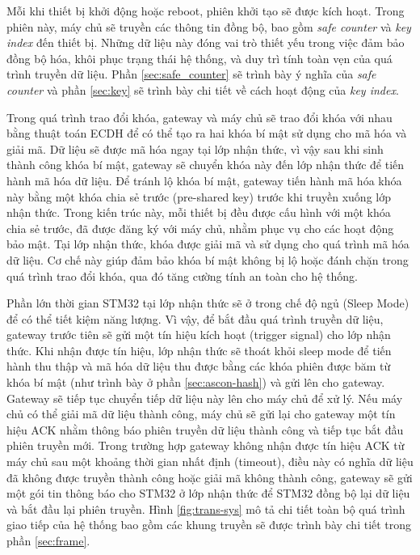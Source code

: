 Mỗi khi thiết bị khởi động hoặc reboot, phiên khởi tạo sẽ được kích hoạt. Trong phiên này, máy chủ sẽ truyền các thông tin đồng bộ, bao gồm \textit{safe counter} và \textit{key index} đến thiết bị. Những dữ liệu này đóng vai trò thiết yếu trong việc đảm bảo đồng bộ hóa, khôi phục trạng thái hệ thống, và duy trì tính toàn vẹn của quá trình truyền dữ liệu. Phần \ref{sec:safe_counter} sẽ trình bày ý nghĩa của \textit{safe counter} và phần \ref{sec:key} sẽ trình bày chi tiết về cách hoạt động của \textit{key index}.

Trong quá trình trao đổi khóa, gateway và máy chủ sẽ trao đổi khóa với nhau bằng thuật toán ECDH để có thể tạo ra hai khóa bí mật sử dụng cho mã hóa và giải mã. Dữ liệu sẽ được mã hóa ngay tại lớp nhận thức, vì vậy sau khi sinh thành công khóa bí mật, gateway sẽ chuyển khóa này đến lớp nhận thức để tiến hành mã hóa dữ liệu. Để tránh lộ khóa bí mật, gateway tiến hành mã hóa khóa này bằng một khóa chia sẻ trước (pre-shared key) trước khi truyền xuống lớp nhận thức. 
Trong kiến trúc này, mỗi thiết bị đều được cấu hình với một khóa chia sẻ trước, đã được đăng ký với máy chủ, nhằm phục vụ cho các hoạt động bảo mật.
Tại lớp nhận thức, khóa được giải mã và sử dụng cho quá trình mã hóa dữ liệu. Cơ chế này giúp đảm bảo khóa bí mật không bị lộ hoặc đánh chặn trong quá trình trao đổi khóa, qua đó tăng cường tính an toàn cho hệ thống.

Phần lớn thời gian STM32 tại lớp nhận thức sẽ ở trong chế độ ngủ (Sleep Mode) để có thể tiết kiệm năng lượng. Vì vậy, để bắt đầu quá trình truyền dữ liệu, gateway trước tiên sẽ gửi một tín hiệu kích hoạt (trigger signal) cho lớp nhận thức. Khi nhận được tín hiệu, lớp nhận thức sẽ thoát khỏi sleep mode để tiến hành thu thập và mã hóa dữ liệu thu được bằng các khóa phiên được băm từ khóa bí mật (như trình bày ở phần \ref{sec:ascon-hash}) và gửi lên cho gateway. Gateway sẽ tiếp tục chuyển tiếp dữ liệu này lên cho máy chủ để xử lý. Nếu máy chủ có thể giải mã dữ liệu thành công, máy chủ sẽ gửi lại cho gateway một tín hiệu ACK nhằm thông báo phiên truyền dữ liệu thành công và tiếp tục bắt đầu phiên truyền mới. Trong trường hợp gateway không nhận được tín hiệu ACK từ máy chủ sau một khoảng thời gian nhất định (timeout), điều này có nghĩa dữ liệu đã không được truyền thành công hoặc giải mã không thành công, gateway sẽ gửi một gói tin thông báo cho STM32 ở lớp nhận thức để STM32 đồng bộ lại dữ liệu và bắt đầu lại phiên truyền. Hình \ref{fig:trans-sys} mô tả chi tiết toàn bộ quá trình giao tiếp của hệ thống bao gồm các khung truyền sẽ được trình bày chi tiết trong phần \ref{sec:frame}.

